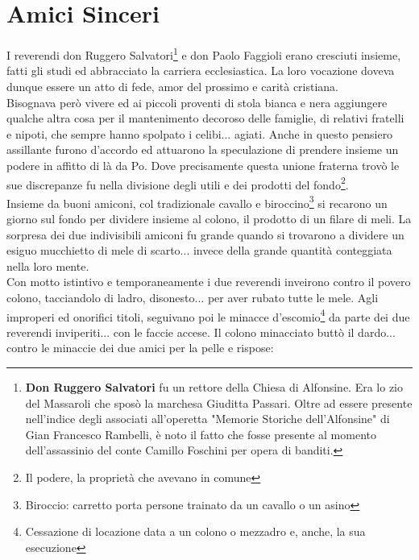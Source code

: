 
\chapter{Amici Sinceri}
I reverendi don Ruggero Salvatori\footnote{\textbf{Don Ruggero Salvatori} fu un rettore della Chiesa di Alfonsine. Era lo zio del Massaroli che sposò la marchesa Giuditta Passari. Oltre ad essere presente nell'indice degli associati all'operetta "Memorie Storiche dell'Alfonsine" di Gian Francesco Rambelli, è noto il fatto che fosse presente al momento dell'assassinio del conte Camillo Foschini per opera di banditi.} e don Paolo Faggioli erano cresciuti insieme, fatti gli studi ed abbracciato la carriera ecclesiastica. La loro vocazione doveva dunque essere un atto di fede, amor del prossimo e carità cristiana.\\
\indent Bisognava però vivere ed ai piccoli proventi di stola bianca e nera aggiungere qualche altra cosa per il mantenimento decoroso delle famiglie, di relativi fratelli e nipoti, che sempre hanno spolpato i celibi... agiati. Anche in questo pensiero assillante furono d'accordo ed attuarono la speculazione di prendere insieme un podere in affitto di là da Po. Dove precisamente questa unione fraterna trovò le sue discrepanze fu nella divisione degli utili e dei prodotti del fondo\footnote{Il podere, la proprietà che avevano in comune}. \\
\indent Insieme da buoni amiconi, col tradizionale cavallo e biroccino\footnote{Biroccio: carretto porta persone trainato da un cavallo o un asino} si recarono un giorno sul fondo per dividere insieme al colono, il prodotto di un filare di meli. La sorpresa dei due indivisibili amiconi fu grande quando si trovarono a dividere un esiguo mucchietto di mele di scarto... invece della grande quantità conteggiata nella loro mente. \\
\indent Con motto istintivo e temporaneamente i due reverendi inveirono contro il povero colono, tacciandolo di ladro, disonesto... per aver rubato tutte le mele. Agli improperi ed onorifici titoli, seguivano poi le minacce d'escomio\footnote{Cessazione di locazione data a un colono o mezzadro e, anche, la sua esecuzione} da parte dei due reverendi inviperiti... con le faccie accese. Il colono minacciato buttò il dardo... contro le minaccie dei due amici per la pelle e rispose: \\
